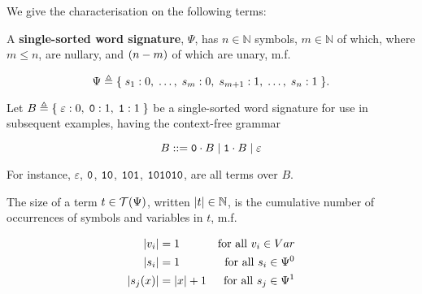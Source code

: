 \def\smashf{\ensuremath{\mathtt{\#}}}

We give the characterisation on the following terms:

\begin{definition} A \textbf{single-sorted word signature}, $\Psi$, has $n \in
\mathbb{N}$ symbols, $m \in \mathbb{N}$ of which, where $m \leq n$, are
nullary, and ${\mathopen{}\left({n-m}\right)\mathclose{}}$ of which are unary, m.f.

$$\Psi \triangleq \mathopen{}\left\{\mathrel{}{s_1 : 0, \; \ldots, \; s_m : 0, \; s_{m+1} : 1, \;
\ldots, \; s_n : 1}\mathrel{}\right\}\mathclose{}.$$

\end{definition}

\begin{example} Let $B \triangleq \mathopen{}\left\{\mathrel{}{\varepsilon : 0, \; \mathtt{0} : 1, \;
\mathtt{1} : 1}\mathrel{}\right\}\mathclose{}$ be a single-sorted word signature for use in subsequent
examples, having the context-free grammar

$$B ::= \mathtt{0} \cdot B \mid \mathtt{1} \cdot B \mid \varepsilon$$

For instance, $\varepsilon$, $\mathtt{0}$, $\mathtt{1}\mathtt{0}$,
$\mathtt{1}\mathtt{0}\mathtt{1}$, $\mathtt{1}\mathtt{0}\mathtt{1}\mathtt{0}\mathtt{1}\mathtt{0}$,
are all terms over $B$.

\end{example}

\begin{definition} \label{def:single-sort-word-term-size} The size of a term $t
\in \mathcal{T}{\mathopen{}\left({\Psi}\right)\mathclose{}}$, written ${\mathopen{}\left|{t}\right|\mathclose{}} \in \mathbb{N}$, is the cumulative
number of occurrences of symbols and variables in $t$, m.f.

\begin{align*}
{\ensuremath{\mathopen{}\left|{v_i}\right|\mathclose{}}} &= 1 & \text{for all $v_i \in Var$} \\
{\mathopen{}\left|{s_i}\right|\mathclose{}} &= 1 & \text{for all $s_i\in \Psi^0$} \\
{\mathopen{}\left|{s_j{\mathopen{}\left({x}\right)\mathclose{}}}\right|\mathclose{}} &= {\mathopen{}\left|{x}\right|\mathclose{}} + 1 & \text{for all $s_j \in \Psi^1$}
\end{align*}

\end{definition}

